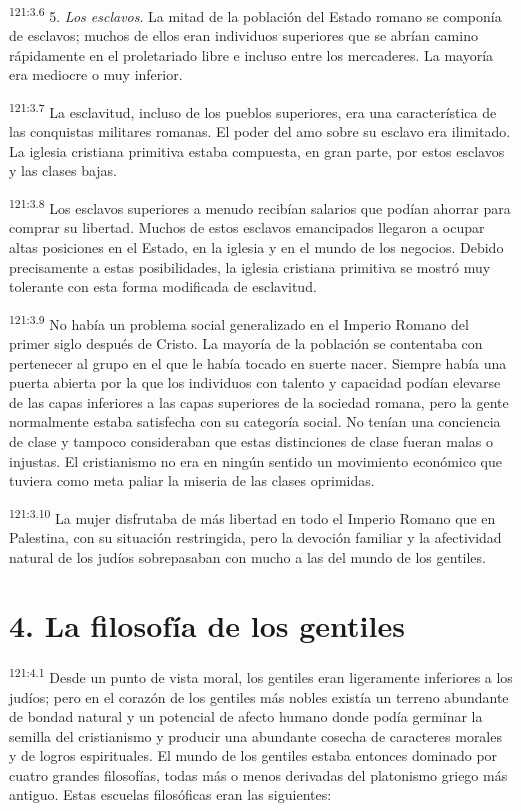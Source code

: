 \par 
\textsuperscript{121:3.6} 5. \textit{Los esclavos}. La mitad de la población del Estado romano se componía de esclavos; muchos de ellos eran individuos superiores que se abrían camino rápidamente en el proletariado libre e incluso entre los mercaderes. La mayoría era mediocre o muy inferior.

\par 
\textsuperscript{121:3.7} La esclavitud, incluso de los pueblos superiores, era una característica de las conquistas militares romanas. El poder del amo sobre su esclavo era ilimitado. La iglesia cristiana primitiva estaba compuesta, en gran parte, por estos esclavos y las clases bajas.

\par 
\textsuperscript{121:3.8} Los esclavos superiores a menudo recibían salarios que podían ahorrar para comprar su libertad. Muchos de estos esclavos emancipados llegaron a ocupar altas posiciones en el Estado, en la iglesia y en el mundo de los negocios. Debido precisamente a estas posibilidades, la iglesia cristiana primitiva se mostró muy tolerante con esta forma modificada de esclavitud.

\par 
\textsuperscript{121:3.9} No había un problema social generalizado en el Imperio Romano del primer siglo después de Cristo. La mayoría de la población se contentaba con pertenecer al grupo en el que le había tocado en suerte nacer. Siempre había una puerta abierta por la que los individuos con talento y capacidad podían elevarse de las capas inferiores a las capas superiores de la sociedad romana, pero la gente normalmente estaba satisfecha con su categoría social. No tenían una conciencia de clase y tampoco consideraban que estas distinciones de clase fueran malas o injustas. El cristianismo no era en ningún sentido un movimiento económico que tuviera como meta paliar la miseria de las clases oprimidas.

\par 
\textsuperscript{121:3.10} La mujer disfrutaba de más libertad en todo el Imperio Romano que en Palestina, con su situación restringida, pero la devoción familiar y la afectividad natural de los judíos sobrepasaban con mucho a las del mundo de los gentiles.

\section*{4. La filosofía de los gentiles}
\par 
\textsuperscript{121:4.1} Desde un punto de vista moral, los gentiles eran ligeramente inferiores a los judíos; pero en el corazón de los gentiles más nobles existía un terreno abundante de bondad natural y un potencial de afecto humano donde podía germinar la semilla del cristianismo y producir una abundante cosecha de caracteres morales y de logros espirituales. El mundo de los gentiles estaba entonces dominado por cuatro grandes filosofías, todas más o menos derivadas del platonismo griego más antiguo. Estas escuelas filosóficas eran las siguientes:

